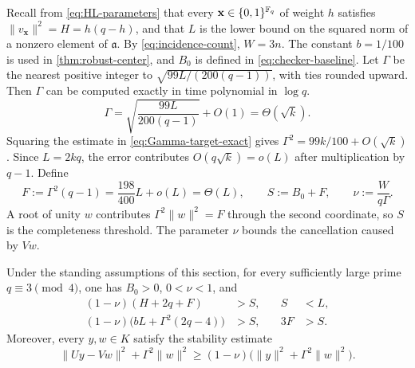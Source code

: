 Recall from \cref{eq:HL-parameters} that every
$\mathbf x\in\{0,1\}^{\mathbb F_q}$ of weight $h$ satisfies
$\|v_{\mathbf x}\|^2=H=h(q-h)$, and
that $L$ is the lower bound on the squared norm of a nonzero element of
$\mathfrak a$.  By \cref{eq:incidence-count}, $W=3n$.  The constant
$b=1/100$ is used in \cref{thm:robust-center}, and $B_0$ is defined in
\cref{eq:checker-baseline}.
Let $\Gamma$ be the nearest positive integer to
$\sqrt{99L/(200(q-1))}$, with ties rounded upward.  Then
$\Gamma$ can be computed exactly in time polynomial in $\log q$.
\begin{equation}
\label{eq:Gamma-target-exact}
 \Gamma
 =\sqrt{\frac{99L}{200(q-1)}}+O(1)
 =\Theta(\sqrt{k}).
\end{equation}
Squaring the estimate in \cref{eq:Gamma-target-exact} gives
$\Gamma^2=99k/100+O(\sqrt{k})$.  Since $L=2kq$, the error contributes
$O(q\sqrt{k})=o(L)$ after multiplication by $q-1$.  Define
\begin{equation}
\label{eq:F-S-nu-exact}
 F:=\Gamma^2(q-1)
   =\frac{198}{400}L+o(L)
   =\Theta(L),
 \qquad
 S:=B_0+F,
 \qquad
 \nu:=\frac{W}{q\Gamma}.
\end{equation}
A root of unity $w$ contributes
$\Gamma^2\|w\|^2=F$ through the second coordinate, so $S$ is the completeness
threshold.  The parameter $\nu$ bounds the cancellation caused by $Vw$.

\begin{lemma}
\label{lem:gap-and-stability}
Under the standing assumptions of this section, for every
sufficiently large prime $q\equiv3\pmod4$, one has $B_0>0$, $0<\nu<1$, and
\[
\begin{aligned}
 (1-\nu)(H+2q+F)&>S,
 &\quad S&<L,\\
 (1-\nu)\bigl(bL+\Gamma^2(2q-4)\bigr)&>S,
 &\quad 3F&>S.
\end{aligned}
\]
Moreover, every $y,w\in K$ satisfy the stability estimate
\begin{equation}
\label{eq:global-stability-exact}
 \|Uy-Vw\|^2+\Gamma^2\|w\|^2
 \ge
 (1-\nu)\bigl(\|y\|^2+\Gamma^2\|w\|^2\bigr).
\end{equation}
\end{lemma}

